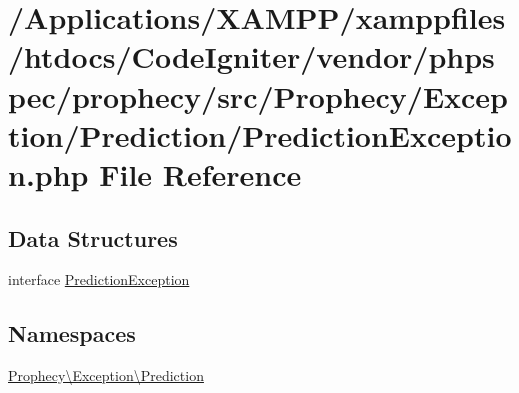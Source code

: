 \hypertarget{_prediction_exception_8php}{}\section{/\+Applications/\+X\+A\+M\+P\+P/xamppfiles/htdocs/\+Code\+Igniter/vendor/phpspec/prophecy/src/\+Prophecy/\+Exception/\+Prediction/\+Prediction\+Exception.php File Reference}
\label{_prediction_exception_8php}
\subsection*{Data Structures}
\begin{DoxyCompactItemize}
\item 
interface \mbox{\hyperlink{interface_prophecy_1_1_exception_1_1_prediction_1_1_prediction_exception}{Prediction\+Exception}}
\end{DoxyCompactItemize}
\subsection*{Namespaces}
\begin{DoxyCompactItemize}
\item 
 \mbox{\hyperlink{namespace_prophecy_1_1_exception_1_1_prediction}{Prophecy\textbackslash{}\+Exception\textbackslash{}\+Prediction}}
\end{DoxyCompactItemize}
